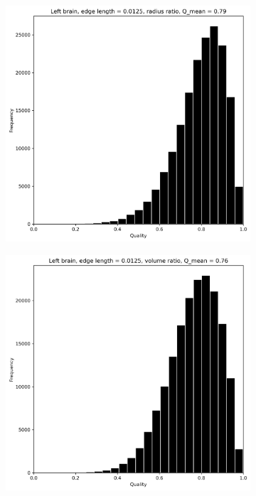 \documentclass[acmtog]{acmart}
\begin{document}
\begin{figure}[H]
\begin{subfigure}{0.22\textwidth}
  \end{subfigure}
  \begin{subfigure}{0.22\textwidth}
    \includegraphics[width=\textwidth]{Images/histograms/Left brain, edge length = 0.0125, radius ratio.png}
    \centering
  \end{subfigure}\hfill
  \begin{subfigure}{0.22\textwidth}
    \centering
    \includegraphics[width=\textwidth]{Images/histograms/Left brain, edge length = 0.0125, volume ratio.png}

\end{subfigure}
\end{figure}
\end{document}
